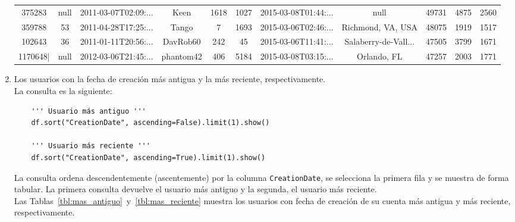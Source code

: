 \documentclass[12pt,a4paper,twoside,openright,titlepage,final]{article}
\begin{document}
\begin{enumerate}
\begin{table}[htbp!]
{\begin{tabular}{@{}ccccccccccc@{}}
				375283             & null         & 2011-03-07T02:09:...  & Keen                 & 1618               & 1027        & 2015-03-08T01:44:...    & null                 & 49731               & 4875             & 2560           \\
				359788             & 53           & 2011-04-28T17:25:...  & Tango                & 7                  & 1693        & 2015-03-06T02:46:...    & Richmond, VA, USA    & 48075               & 1919             & 1517           \\
				102643             & 36           & 2011-01-11T20:56:...  & DavRob60             & 242                & 45          & 2015-03-06T11:41:...    & Salaberry-de-Vall... & 47505               & 3799             & 1671           \\
				1170648|           & null         & 2012-03-06T21:45:...  & phantom42            & 406                & 5184        & 2015-03-08T03:15:...    & Orlando, FL          & 47257               & 2003             & 1771           \\ \bottomrule
			\end{tabular}%
		}
	\end{table}
		
	\item Los usuarios con la fecha de creación más antigua y la más reciente, respectivamente.\\
	
	La consulta es la siguiente:
	
	\begin{verbatim}
	''' Usuario más antiguo '''
	df.sort("CreationDate", ascending=False).limit(1).show()
	
	''' Usuario más reciente '''
	df.sort("CreationDate", ascending=True).limit(1).show()
	\end{verbatim}
	
	La consulta ordena descendentemente (ascentemente) por la columna \texttt{CreationDate}, se selecciona la primera fila y se muestra de forma tabular. La primera consulta devuelve el usuario más antiguo y la segunda, el usuario más reciente.\\
	
	Las Tablas~\ref{tbl:mas_antiguo}~y~\ref{tbl:mas_reciente} muestra los usuarios con fecha de creación de su cuenta más antigua y más reciente, respectivamente.\\  
	

\end{enumerate}
\end{document}
